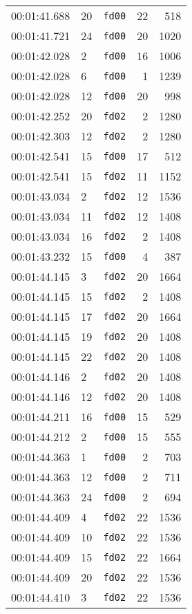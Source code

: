 \documentclass{article}
\begin{document}
\begin{longtable}{lllrr}
00:01:41.688 & 20 & \texttt{fd00} & 22 & 518 \\
00:01:41.721 & 24 & \texttt{fd00} & 20 & 1020 \\
00:01:42.028 & 2 & \texttt{fd00} & 16 & 1006 \\
00:01:42.028 & 6 & \texttt{fd00} & 1 & 1239 \\
00:01:42.028 & 12 & \texttt{fd00} & 20 & 998 \\
00:01:42.252 & 20 & \texttt{fd02} & 2 & 1280 \\
00:01:42.303 & 12 & \texttt{fd02} & 2 & 1280 \\
00:01:42.541 & 15 & \texttt{fd00} & 17 & 512 \\
00:01:42.541 & 15 & \texttt{fd02} & 11 & 1152 \\
00:01:43.034 & 2 & \texttt{fd02} & 12 & 1536 \\
00:01:43.034 & 11 & \texttt{fd02} & 12 & 1408 \\
00:01:43.034 & 16 & \texttt{fd02} & 2 & 1408 \\
00:01:43.232 & 15 & \texttt{fd00} & 4 & 387 \\
00:01:44.145 & 3 & \texttt{fd02} & 20 & 1664 \\
00:01:44.145 & 15 & \texttt{fd02} & 2 & 1408 \\
00:01:44.145 & 17 & \texttt{fd02} & 20 & 1664 \\
00:01:44.145 & 19 & \texttt{fd02} & 20 & 1408 \\
00:01:44.145 & 22 & \texttt{fd02} & 20 & 1408 \\
00:01:44.146 & 2 & \texttt{fd02} & 20 & 1408 \\
00:01:44.146 & 12 & \texttt{fd02} & 20 & 1408 \\
00:01:44.211 & 16 & \texttt{fd00} & 15 & 529 \\
00:01:44.212 & 2 & \texttt{fd00} & 15 & 555 \\
00:01:44.363 & 1 & \texttt{fd00} & 2 & 703 \\
00:01:44.363 & 12 & \texttt{fd00} & 2 & 711 \\
00:01:44.363 & 24 & \texttt{fd00} & 2 & 694 \\
00:01:44.409 & 4 & \texttt{fd02} & 22 & 1536 \\
00:01:44.409 & 10 & \texttt{fd02} & 22 & 1536 \\
00:01:44.409 & 15 & \texttt{fd02} & 22 & 1664 \\
00:01:44.409 & 20 & \texttt{fd02} & 22 & 1536 \\
00:01:44.410 & 3 & \texttt{fd02} & 22 & 1536 \\

\end{longtable}
\end{document}
